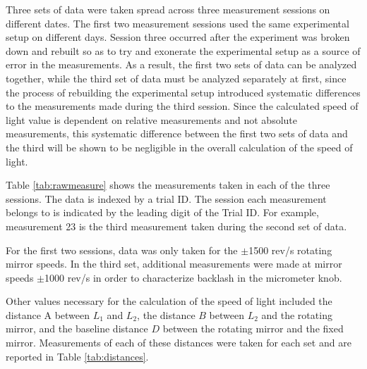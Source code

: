 \documentclass[twocolumn]{article}
\begin{document}
	Three sets of data were taken spread across three measurement sessions on different dates. 
	The first two measurement sessions used the same experimental setup on different days. 
	Session three occurred after the experiment was broken down and rebuilt so as to try and exonerate the experimental setup as a source of error in the measurements. 
	As a result, the first two sets of data can be analyzed together, while the third set of data must be analyzed separately at first, since the process of rebuilding the experimental setup introduced systematic differences to the measurements made during the third session. 
	Since the calculated speed of light value is dependent on relative measurements and not absolute measurements, this systematic difference between the first two sets of data and the third will be shown to be negligible in the overall calculation of the speed of light.
	
	Table \ref{tab:rawmeasure} shows the measurements taken in each of the three sessions.
	The data is indexed by a trial ID. 
	The session each measurement belongs to is indicated by the leading digit of the Trial ID. 
	For example, measurement 23 is the third measurement taken during the second set of data.
	
	For the first two sessions, data was only taken for the $\pm$1500 rev/s rotating mirror speeds. 
	In the third set, additional measurements were made at mirror speeds $\pm$1000 rev/s in order to characterize backlash in the micrometer knob.
	
	Other values necessary for the calculation of the speed of light included the distance A between $L_1$ and $L_2$, the distance $B$ between $L_2$ and the rotating mirror, and the baseline distance $D$ between the rotating mirror and the fixed mirror. Measurements of each of these distances were taken for each set and are reported in Table \ref{tab:distances}.
		
\end{document}
